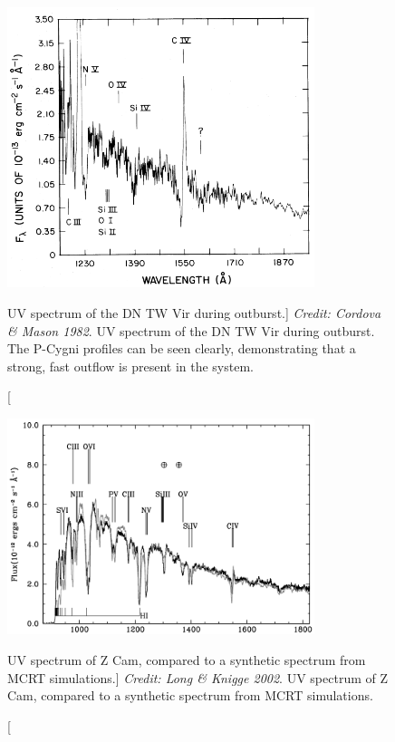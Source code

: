 \begin{figure}
\centering
\includegraphics[width=0.8\textwidth]{figures/02-outflows/cordova_mason.png}
\caption
[UV spectrum of the DN TW Vir during outburst.]
{
{\sl Credit: Cordova \& Mason 1982}. 
UV spectrum of the DN TW Vir during outburst. The P-Cygni profiles
can be seen clearly, demonstrating that a strong, fast outflow is present
in the system. 
} 
\label{fig:cordova}
\end{figure}

\begin{figure}
\centering
\includegraphics[width=0.8\textwidth]{figures/02-outflows/zcam_lk02.png}
\caption
[UV spectrum of Z Cam, compared to a synthetic spectrum from MCRT simulations.]
{
{\sl Credit: Long \& Knigge 2002}. 
UV spectrum of Z Cam, compared to a synthetic spectrum from MCRT simulations.
} 
\label{fig:zcam_lk02}
\end{figure}

